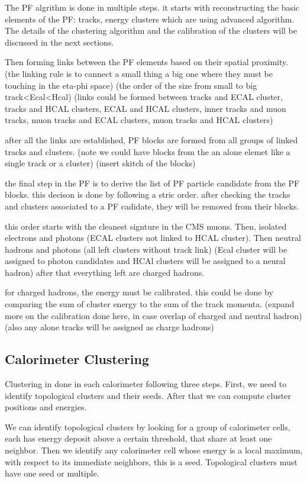 The PF algrithm is done in multiple steps.
it starts with reconstructing the basic elements of the PF: tracks, energy clusters which are using advanced algorithm.
The details of the clustering algorithm and the calibration of the clusters will be discussed in the next sections.

Then forming links between the PF elements based on their spatial proximity.
(the linking rule is to cannect a small thing a big one where they must be touching in the eta-phi space)
(the order of the size from small to big track<Ecal<Hcal)
(links could be formed between tracks and ECAL cluster, tracks and HCAL clusters, ECAL and HCAL clusters, inner tracks and muon tracks, muon tracks and ECAL clusters, muon tracks and HCAL clusters)

after all the links are established, PF blocks are formed from all groups of linked tracks and clusters.  
(note we could have blocks from the an alone elemet like a single track or a cluster) 
(insert skitch of the blocks) 

the final step in the PF is to derive the list of PF particle candidate from the PF blocks.
this decison is done by following a stric order. after checking the tracks and clusters associated to a PF cadidate, they will be removed from their blocks.

this order starts with the cleanest signture in the CMS muons. Then, isolated electrons and photons (ECAL clusters not linked to HCAL cluster).
Then neutral hadrons and photons (all left clusters without track link) (Ecal cluster will be assigned to photon candidates and HCAl clusters will be assigned to a neural hadron)
after that everything left are charged hadrons.

for charged hadrons, the energy must be calibrated. this could be done by comparing the sum of cluster energy to the sum of the track momenta.
(expand more on the calibration done here, in case overlap of charged and neutral hadron)
(also any alone tracks will be assigned as charge hadrons)

\subsection{Calorimeter Clustering}

Clustering in done in each calorimeter following three steps.
First, we need to identify topological clusters and their seeds. After that we can compute cluster positions and energies.

We can identify topological clusters by looking for a group of calorimeter cells, each has energy deposit above a certain threshold, that share at least one neighbor.
Then we identify any calorimeter cell whose energy is a local maximum, with respect to its immediate neighbors, this is a seed.
Topological clusters must have one seed or multiple.

